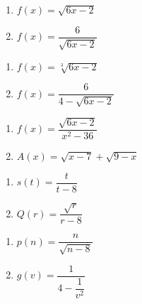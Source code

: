 \begin{multicols}{2}
\begin{enumerate}
\setcounter{enumi}{\value{HW}}

\item  $f(x) = \sqrt{6x-2}$
\item  $f(x) = \dfrac{6}{\sqrt{6x-2}}$

\setcounter{HW}{\value{enumi}}
\end{enumerate}
\end{multicols}

\begin{multicols}{2}
\begin{enumerate}
\setcounter{enumi}{\value{HW}}

\item  $f(x) = \sqrt[3]{6x-2}$
\item  $f(x) = \dfrac{6}{4 - \sqrt{6x-2}}$

\setcounter{HW}{\value{enumi}}
\end{enumerate}
\end{multicols}

\begin{multicols}{2}
\begin{enumerate}
\setcounter{enumi}{\value{HW}}

\item  $f(x) = \dfrac{\sqrt{6x-2}}{x^2-36}$
\item $A(x) = \sqrt{x - 7} + \sqrt{9 - x}$

\setcounter{HW}{\value{enumi}}
\end{enumerate}
\end{multicols}

\begin{multicols}{2}
\begin{enumerate}
\setcounter{enumi}{\value{HW}}

\item $s(t) = \dfrac{t}{t - 8}$
\item $Q(r) = \dfrac{\sqrt{r}}{r - 8}$


\setcounter{HW}{\value{enumi}}
\end{enumerate}
\end{multicols}

\begin{multicols}{2}
\begin{enumerate}
\setcounter{enumi}{\value{HW}}

\item $p(n) = \dfrac{n}{\sqrt{n - 8}}$
\item $g(v) = \dfrac{1}{4 - \dfrac{1}{v^{2}}}$

\setcounter{HW}{\value{enumi}}
\end{enumerate}
\end{multicols}

